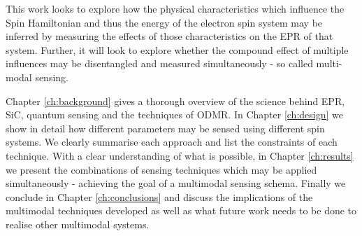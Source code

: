 %
%
%
%
%

This work looks to explore how the physical characteristics which influence the Spin Hamiltonian and thus the energy of the electron spin system may be inferred by measuring the effects of those characteristics on the EPR of that system. Further, it will look to explore whether the compound effect of multiple influences may be disentangled and measured simultaneously - so called multi-modal sensing.

Chapter \ref{ch:background} gives a thorough overview of the science behind EPR, SiC, quantum sensing and the techniques of ODMR. 
In Chapter \ref{ch:design} we show in detail how different parameters may be sensed using different spin systems. We clearly summarise each approach and list the constraints of each technique. With a clear understanding of what is possible, in Chapter \ref{ch:results} we present the combinations of sensing techniques which may be applied simultaneously - achieving the goal of a multimodal sensing schema. Finally we conclude in Chapter \ref{ch:conclusions} and discuss the implications of the multimodal techniques developed as well as what future work needs to be done to realise other multimodal systems.  

